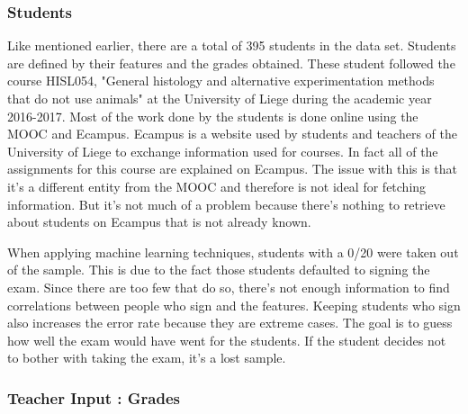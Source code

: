 \documentclass[a4paper,11pt]{report}
\numberwithin{figure}{section} %
\begin{document}
    	\subsubsection{Students}
    Like mentioned earlier, there are a total of 395 students in the data set. Students are defined by their features and the grades obtained. These student followed the course HISL054, "General histology and alternative experimentation methods that do not use animals" at the University of Liege during the academic year 2016-2017. Most of the work done by the students is done online using the MOOC and Ecampus. Ecampus is a website used by students and teachers of the University of Liege to exchange information used for courses. In fact all of the assignments for this course are explained on Ecampus. The issue with this is that it's a different entity from the MOOC and therefore is not ideal for fetching information. But it's not much of a problem because there's nothing to retrieve about students on Ecampus that is not already known.\newline
    
    When applying machine learning techniques, students with a 0/20 were taken out of the sample. This is due to the fact those students defaulted to signing the exam. Since there are too few that do so, there's not enough information to find correlations between people who sign and the features. Keeping students who sign also increases the error rate because they are extreme cases. The goal is to guess how well the exam would have went for the students. If the student decides not to bother with taking the exam, it's a lost sample.\newline
    
    	\subsubsection{Teacher Input : Grades}
    
    
\end{document}
